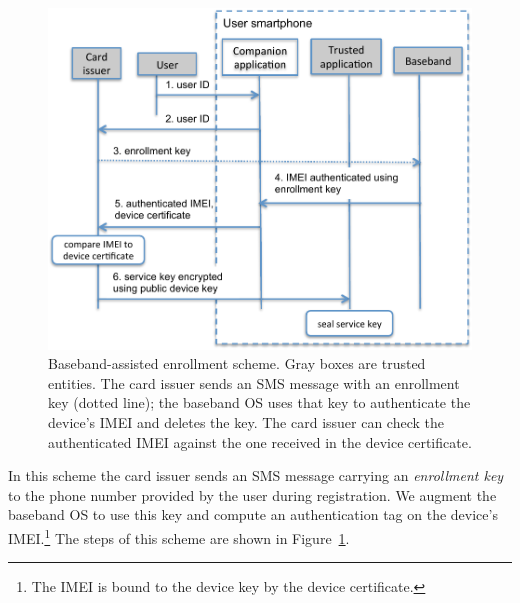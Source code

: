 \begin{figure}[!ht]
    \centering
    \includegraphics[width=\linewidth]{figures/phonesecures/tee_enrollment-baseband}
    \caption[Baseband-assisted enrollment scheme]{Baseband-assisted enrollment
    scheme. Gray boxes are trusted entities. The card issuer sends an SMS
    message with an enrollment key (dotted line); the baseband OS uses that key
    to authenticate the device's IMEI and deletes the key. The card issuer can
    check the authenticated IMEI against the one received in the device
    certificate.}
    \label{fig:ps_tee_enrollment-baseband}
\end{figure}

In this scheme the card issuer sends an SMS message carrying an
\emph{enrollment key} to the phone number provided by the user during
registration. We augment the baseband OS to use this key and compute an
authentication tag on the device's IMEI.\footnote{The IMEI is bound to the
device key by the device certificate.} The steps of this scheme are shown in
Figure~\ref{fig:ps_tee_enrollment-baseband}.

